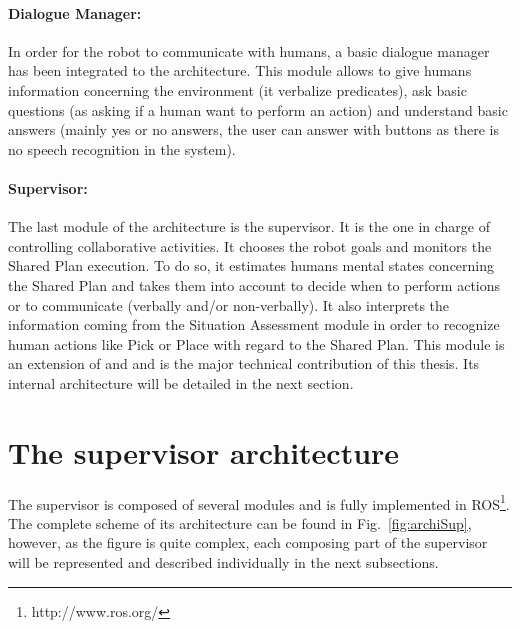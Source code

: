 \documentclass[english,a4paper,11pt,twoside]{StyleThese}
\begin{document}
\paragraph{Dialogue Manager:}
In order for the robot to communicate with humans, a basic dialogue manager has been integrated to the architecture. This module allows to give humans information concerning the environment (it verbalize predicates), ask basic questions (as asking if a human want to perform an action) and understand basic answers (mainly yes or no answers, the user can answer with buttons as there is no speech recognition in the system). 


\paragraph{Supervisor:}
The last module of the architecture is the supervisor. It is the one in charge of controlling collaborative activities. It chooses the robot goals and monitors the Shared Plan execution. To do so, it estimates humans mental states concerning the Shared Plan and takes them into account to decide when to perform actions or to communicate (verbally and/or non-verbally). It also interprets the information coming from the Situation Assessment module in order to recognize human actions like Pick or Place with regard to the Shared Plan. This module is an extension of \cite{clodic2009shary} and \cite{fiore2016planning} and is the major technical contribution of this thesis. Its internal architecture will be detailed in the next section.

\newpage
\section{The supervisor architecture}

The supervisor is composed of several modules and is fully implemented in ROS\footnote{http://www.ros.org/}. The complete scheme of its architecture can be found in Fig.~\ref{fig:archiSup}, however, as the figure is quite complex, each composing part of the supervisor will be represented and described individually in the next subsections. 
\end{document}
